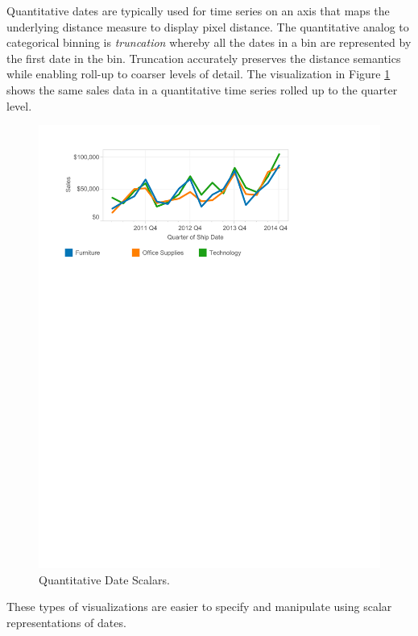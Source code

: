 Quantitative dates are typically used for time series on an axis that maps the underlying distance measure to display pixel distance. The quantitative analog to categorical binning is \textit{truncation} whereby all the dates in a bin are represented by the first date in the bin. Truncation accurately preserves the distance semantics while enabling roll-up to coarser levels of detail. The visualization in Figure \ref{fig:I2} shows the same sales data in a quantitative time series rolled up to the quarter level.

\begin{figure}[ht]
\centering
\includegraphics[width=\columnwidth]{figures/FigureI2}
\caption{Quantitative Date Scalars.}
\label{fig:I2}
\end{figure}

These types of visualizations are easier to specify and manipulate using scalar representations of dates.

